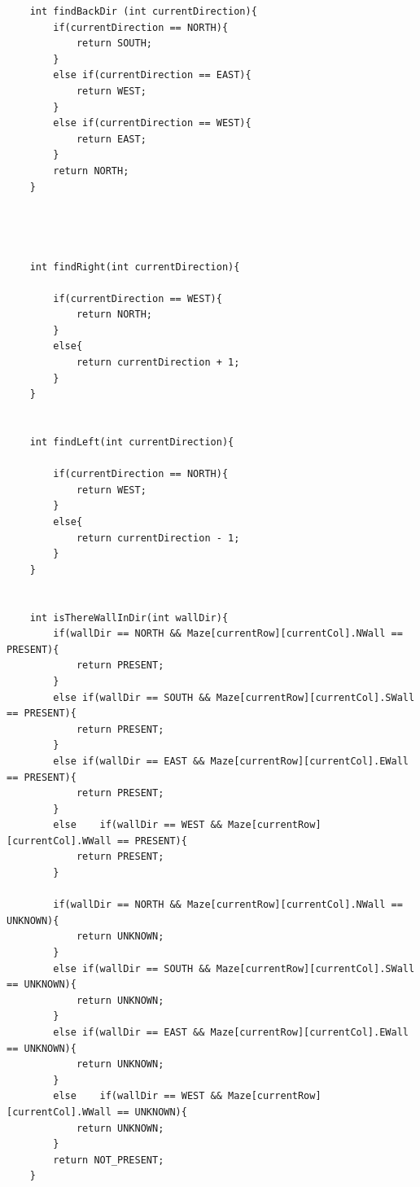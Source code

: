 \documentclass[11pt]{article}
\begin{document}
\begin{linenumbers}
\begin{verbatim}
    int findBackDir (int currentDirection){
        if(currentDirection == NORTH){
            return SOUTH;
        }
        else if(currentDirection == EAST){
            return WEST;
        }
        else if(currentDirection == WEST){
            return EAST;
        }
        return NORTH;
    }




    int findRight(int currentDirection){

        if(currentDirection == WEST){
            return NORTH;
        }
        else{
            return currentDirection + 1;
        }
    }


    int findLeft(int currentDirection){

        if(currentDirection == NORTH){
            return WEST;
        }
        else{
            return currentDirection - 1;
        }
    }


    int isThereWallInDir(int wallDir){
        if(wallDir == NORTH && Maze[currentRow][currentCol].NWall == PRESENT){
            return PRESENT;
        }
        else if(wallDir == SOUTH && Maze[currentRow][currentCol].SWall == PRESENT){
            return PRESENT;
        }
        else if(wallDir == EAST && Maze[currentRow][currentCol].EWall == PRESENT){
            return PRESENT;
        }
        else	if(wallDir == WEST && Maze[currentRow][currentCol].WWall == PRESENT){
            return PRESENT;
        }
        
        if(wallDir == NORTH && Maze[currentRow][currentCol].NWall == UNKNOWN){
            return UNKNOWN;
        }
        else if(wallDir == SOUTH && Maze[currentRow][currentCol].SWall == UNKNOWN){
            return UNKNOWN;
        }
        else if(wallDir == EAST && Maze[currentRow][currentCol].EWall == UNKNOWN){
            return UNKNOWN;
        }
        else	if(wallDir == WEST && Maze[currentRow][currentCol].WWall == UNKNOWN){
            return UNKNOWN;
        }
        return NOT_PRESENT;
    }
\end{verbatim}
\end{linenumbers}
\end{document}
